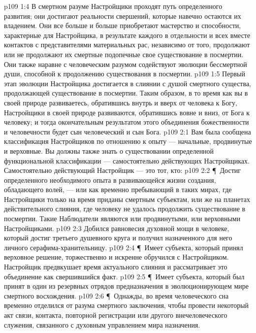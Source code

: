 \vs p109 1:4 В смертном разуме Настройщики проходят путь определенного развития; они достигают реальности свершений, которые навечно остаются их владением. Они все больше и больше приобретают мастерство и способности, характерные для Настройщика, в результате каждого в отдельности и всех вместе контактов с представителями материальных рас, независимо от того, продолжают или не продолжают их смертные подопечные свое существование в посмертии. Они также наравне с человеческим разумом содействуют эволюции бессмертной души, способной к продолжению существования в посмертии.
\vs p109 1:5 Первый этап эволюции Настройщика достигается в слиянии с душой смертного существа, продолжающей существование в посмертии. Таким образом, в то время как вы в своей природе развиваетесь, обратившись внутрь и вверх от человека к Богу, Настройщики в своей природе развиваются, обратившись вовне и вниз, от Бога к человеку; и тогда окончательным результатом этого объединения божественности и человечности будет сын человеческий и сын Бога.
\vs p109 2:1 Вам была сообщена классификация Настройщиков по отношению к опыту --- начальные, продвинутые и верховные. Вы должны также знать о существовании определенной функциональной классификации --- самостоятельно действующих Настройщиках. Самостоятельно действующий Настройщик --- это тот, кто:
\vs p109 2:2 \P\ \bibnobreakspace Достиг определенного необходимого опыта в развивающейся жизни создания, обладающего волей, --- или как временно пребывающий в таких мирах, где Настройщики только на время приданы смертным субъектам, или же на планетах действительного слияния, где человеку не удалось продолжить существование в посмертии. Такие Наблюдатели являются или продвинутыми, или верховными Настройщиками.
\vs p109 2:3 \bibnobreakspace Добился равновесия духовной мощи в человеке, который достиг третьего душевного круга и получил назначенного для него личного серафима\hyp{}хранительницу.
\vs p109 2:4 \P\ \bibnobreakspace Имеет субъекта, который принял верховное решение, торжественно и искренне обручился с Настройщиком. Настройщик предвкушает время актуального слияния и рассматривает это объединение как свершившийся факт.
\vs p109 2:5 \P\ \bibnobreakspace Имеет субъекта, который был принят в один из резервных отрядов предназначения в эволюционирующем мире смертного восхождения.
\vs p109 2:6 \P\ \bibnobreakspace Однажды, во время человеческого сна временно отделился от разума смертного заключения, чтобы провести некоторый акт связи, контакта, повторной регистрации или другого внечеловеческого служения, связанного с духовным управлением мира назначения.
